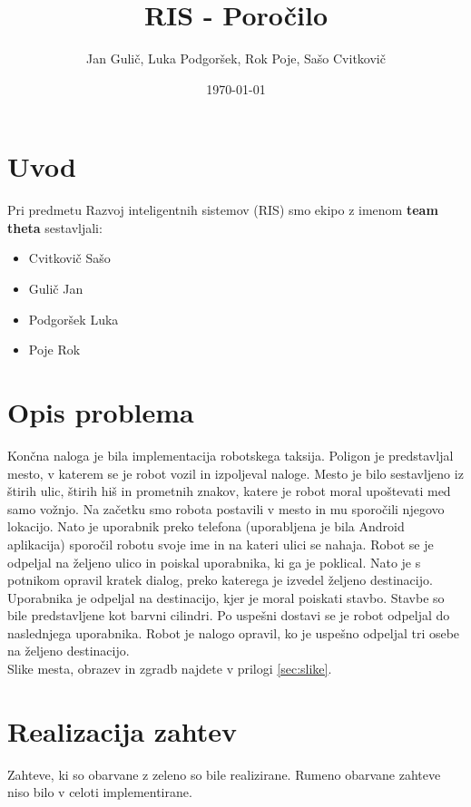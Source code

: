 \documentclass[a4paper,11pt]{article}
\title{RIS - Poročilo}
\author{Jan Gulič, Luka Podgoršek, Rok Poje, Sašo Cvitkovič}
\date{\today}
\begin{document}
\maketitle
\section{Uvod}

Pri predmetu Razvoj inteligentnih sistemov (RIS) smo ekipo z imenom \textbf{team theta} sestavljali:
\begin{itemize}
	\item Cvitkovič Sašo
	\item Gulič Jan
	\item Podgoršek Luka
	\item Poje Rok
\end{itemize}


\section{Opis problema}

Končna naloga je bila implementacija robotskega taksija. Poligon je predstavljal mesto, v katerem se je robot vozil in izpoljeval naloge. Mesto je bilo sestavljeno iz štirih ulic, štirih hiš in prometnih znakov, katere je robot moral upoštevati med samo vožnjo. Na začetku smo robota postavili v mesto in mu sporočili njegovo lokacijo. Nato je uporabnik preko telefona (uporabljena je bila Android aplikacija) sporočil robotu svoje ime in na kateri ulici se nahaja. Robot se je odpeljal na željeno ulico in poiskal uporabnika, ki ga je poklical. Nato je s potnikom opravil kratek dialog, preko katerega je izvedel željeno destinacijo. Uporabnika je odpeljal na destinacijo, kjer je moral poiskati stavbo. Stavbe so bile predstavljene kot barvni cilindri. Po uspešni dostavi se je robot odpeljal do naslednjega uporabnika. 
Robot je nalogo opravil, ko je uspešno odpeljal tri osebe na željeno destinacijo.\\


Slike mesta, obrazev in zgradb najdete v prilogi \ref{sec:slike}{}.

\pagebreak
\section{Realizacija zahtev}
Zahteve, ki so obarvane z zeleno so bile realizirane. Rumeno obarvane zahteve niso bilo v celoti implementirane.
\end{document}
